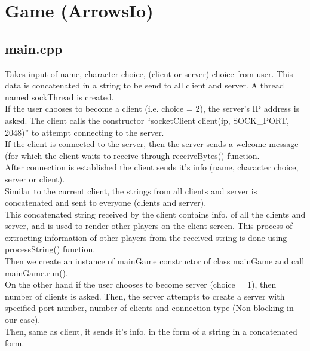 \documentclass{article}
\begin{document}
\section{Game (ArrowsIo)}
\subsection{main.cpp}
Takes input of name, character choice, (client or server) choice from user. This data is concatenated in a string to be send to all client and server. A thread named sockThread is created. \\

If the user chooses to become a client (i.e. choice = 2), the server’s IP address is asked. The client calls the constructor “socketClient client(ip, SOCK\_PORT, 2048)” to attempt connecting to the server.\\

If the client is connected to the server, then the server sends a welcome message (for which the client waits to receive through receiveBytes() function.\\

After connection is established the client sends it’s info (name, character choice, server or client). \\

Similar to the current client, the strings from all clients and server is concatenated and sent to everyone (clients and server). \\

This concatenated string received by the client contains info. of all the clients and server, and is used to render other players on the client screen. This process of extracting information of other players from the received string is done using processString() function. \\

Then we create an instance of mainGame constructor of class mainGame and call mainGame.run(). \\

On the other hand if the user chooses to become server (choice = 1), then number of clients is asked. Then, the server attempts to create a server with specified port number, number of clients and connection type (Non blocking in our case). \\

Then, same as client, it sends it’s info. in the form of a string in a concatenated form. \\
\end{document}
